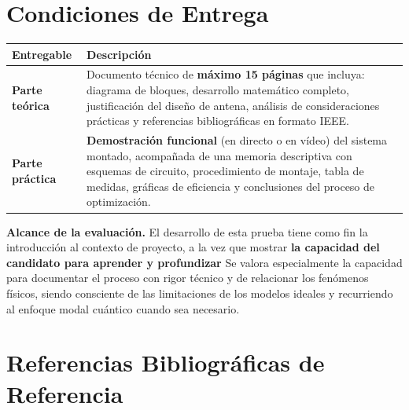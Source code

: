 \documentclass[11pt,a4paper]{article}
\begin{document}
\newpage
\section*{Condiciones de Entrega}

\noindent\begin{tabularx}{\linewidth}{@{} >{\bfseries}p{3cm} X @{}}
  \toprule[1.2pt]
  \rowcolor{azulprincipal}
  \color{white}\textbf{Entregable} & \color{white}\textbf{Descripción} \\
  \midrule
  Parte teórica &
    Documento técnico de \textbf{máximo 15 páginas} que incluya: diagrama de bloques,
    desarrollo matemático completo, justificación del diseño de antena, análisis de
    consideraciones prácticas y referencias bibliográficas en formato IEEE. \\[4pt]
  Parte práctica &
    \textbf{Demostración funcional} (en directo o en vídeo) del sistema montado, acompañada
    de una memoria descriptiva con esquemas de circuito, procedimiento de montaje, tabla de
    medidas, gráficas de eficiencia y conclusiones del proceso de optimización. \\[4pt]
  \bottomrule[1.2pt]
\end{tabularx}

\vspace{12pt}
\begin{tcolorbox}[
  enhanced, colback=azulprincipal!8!white, colframe=azulprincipal,
  boxrule=0.5pt, arc=3pt, left=10pt, right=10pt
]
\small
\textbf{Alcance de la evaluación.}
El desarrollo de esta prueba tiene como fin la introducción al contexto de proyecto, a la vez que mostrar \textbf{la capacidad del candidato para aprender y profundizar} 
Se valora especialmente la capacidad para documentar el proceso con rigor técnico y de relacionar los fenómenos físicos, siendo consciente de las limitaciones de los modelos ideales y recurriendo al enfoque modal cuántico cuando sea necesario. 
\end{tcolorbox}


\newpage
\section*{Referencias Bibliográficas de Referencia}
\end{document}
